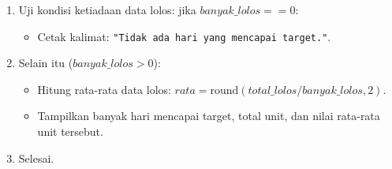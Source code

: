 \documentclass[12pt,a4paper]{article}
\begin{document}
\begin{enumerate}
\begin{enumerate}[label=\alph*.]
\begin{enumerate}[label=\roman*.]
\begin{itemize}
            \end{itemize}
        \end{enumerate}
        \item Uji kondisi ketiadaan data lolos: jika $banyak\_lolos == 0$:
        \begin{itemize}
            \item Cetak kalimat: \texttt{"Tidak ada hari yang mencapai target."}.
        \end{itemize}
        \item Selain itu ($banyak\_lolos > 0$):
        \begin{itemize}
            \item Hitung rata-rata data lolos: $rata = \text{round}(total\_lolos / banyak\_lolos, 2)$.
            \item Tampilkan banyak hari mencapai target, total unit, dan nilai rata-rata unit tersebut.
        \end{itemize}
        \item Selesai.
    \end{enumerate}
\end{enumerate}
\end{document}
